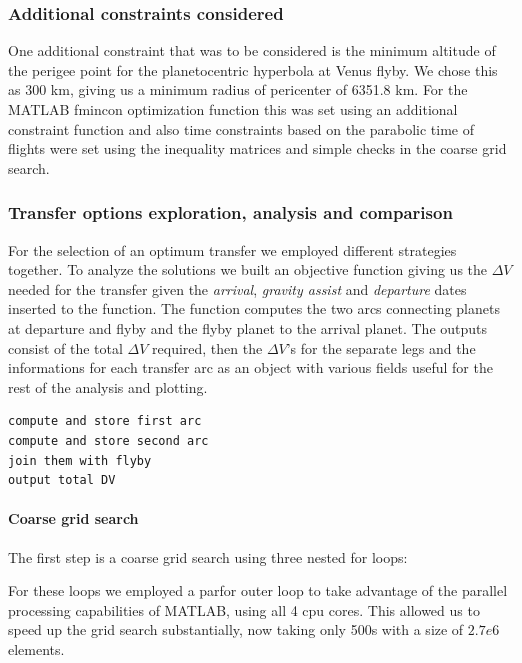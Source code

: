 \documentclass[11pt,a4paper]{report}
\begin{document}
\subsubsection{Additional constraints considered}
One additional constraint that was to be considered is the minimum altitude of the perigee point for the planetocentric hyperbola at Venus flyby. We chose this as 300 km, giving us a minimum radius of pericenter of 6351.8 km. For the MATLAB fmincon optimization function this was set using an additional constraint function and also time constraints based on the parabolic time of flights were set using the inequality matrices and simple checks in the coarse grid search.

\subsubsection{Transfer options exploration, analysis and comparison}
For the selection of an optimum transfer we employed different strategies together.
To analyze the solutions we built an objective function giving us the $\Delta V$ needed for the transfer given the \emph{arrival}, \emph{gravity assist} and \emph{departure} dates inserted to the function. The function computes the two arcs connecting planets at departure and flyby and the flyby planet to the arrival planet. The outputs consist of the total $\Delta V$ required, then the $\Delta V$'s for the separate legs and the informations for each transfer arc as an object with various fields useful for the rest of the analysis and plotting.

\lstset{style=mystyle}
\begin{lstlisting}[frame=single,caption=GAtransfer objective function structure]  
compute and store first arc
compute and store second arc
join them with flyby
output total DV 
\end{lstlisting}

\paragraph{Coarse grid search}
The first step is a coarse grid search using three nested for loops:\\

\lstset{style=mystyle}


For these loops we employed a parfor outer loop to take advantage of the parallel processing capabilities of MATLAB, using all 4 cpu cores. This allowed us to speed up the grid search substantially, now taking only 500s with a size of $2.7e6  $ elements.
\end{document}
